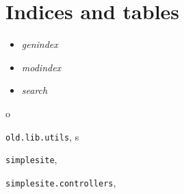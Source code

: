 \documentclass[letterpaper,10pt,english]{sphinxmanual}
\begin{document}
\chapter{Indices and tables}
\label{index:indices-and-tables}\begin{itemize}
\item {} 
\emph{genindex}

\item {} 
\emph{modindex}

\item {} 
\emph{search}

\end{itemize}


\renewcommand{\indexname}{Python Module Index}
\begin{theindex}
\def\bigletter#1{{\Large\sffamily#1}\nopagebreak\vspace{1mm}}
\bigletter{o}
\item {\texttt{old.lib.utils}}, \pageref{api:module-old.lib.utils}
\indexspace
\bigletter{s}
\item {\texttt{simplesite}}, \pageref{api:module-simplesite}
\item {\texttt{simplesite.controllers}}, \pageref{api:module-simplesite.controllers}
\end{theindex}

\renewcommand{\indexname}{Index}
\printindex
\end{document}
